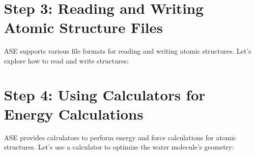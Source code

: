 \documentclass[letterpaper,10pt,english]{sphinxmanual}
\begin{document}
\begin{sphinxVerbatim}[commandchars=\\\{\}]
   

   \PYG{p}{[}\PYG{p}{[}  \PYG{p}{]} \PYG{p}{[}  \PYG{p}{]} \PYG{p}{[}  \PYG{p}{]}\PYG{p}{]}

\end{sphinxVerbatim}


\section{Step 3: Reading and Writing Atomic Structure Files}
\label{\detokenize{asebasics/asebasics:step-3-reading-and-writing-atomic-structure-files}}
\sphinxAtStartPar
ASE supports various file formats for reading and writing atomic structures. Let’s explore how to read and write structures:

\begin{sphinxVerbatim}[commandchars=\\\{\}]

   
  
\end{sphinxVerbatim}


\section{Step 4: Using Calculators for Energy Calculations}
\label{\detokenize{asebasics/asebasics:step-4-using-calculators-for-energy-calculations}}
\sphinxAtStartPar
ASE provides calculators to perform energy and force calculations for atomic structures. Let’s use a calculator to optimize the water molecule’s geometry:
\end{document}
